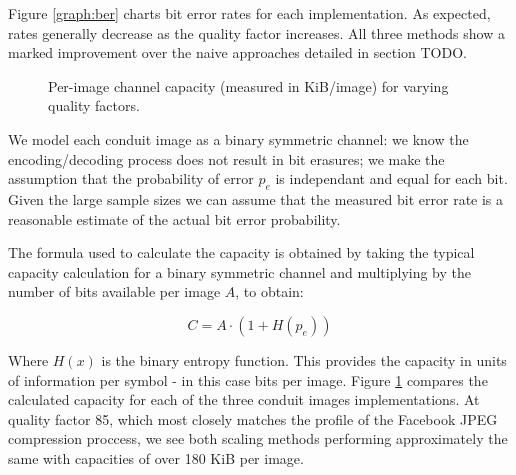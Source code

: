 Figure \ref{graph:ber} charts bit error rates for each implementation. As expected, rates generally decrease as the quality factor increases. All three methods show a marked improvement over the naive approaches detailed in section TODO.

\begin{figure}[tbph]
  \begin{center}
    \caption{Per-image channel capacity (measured in KiB/image) for varying quality factors.}
    \label{graph:capacity}
  \end{center}
\end{figure}

We model each conduit image as a binary symmetric channel: we know the encoding/decoding process does not result in bit erasures; we make the assumption that the probability of error $p_e$ is independant and equal for each bit. Given the large sample sizes we can assume that the measured bit error rate is a reasonable estimate of the actual bit error probability.

The formula used to calculate the capacity is obtained by taking the typical capacity calculation for a binary symmetric channel and multiplying by the number of bits available per image $A$, to obtain:

\begin{equation}
    C = A \cdot (1 + H(p_e))
\end{equation}

Where $H(x)$ is the binary entropy function. This provides the capacity in units of information per symbol - in this case bits per image. Figure \ref{graph:capacity} compares the calculated capacity for each of the three conduit images implementations. At quality factor 85, which most closely matches the profile of the Facebook JPEG compression proccess, we see both scaling methods performing approximately the same with capacities of over 180 KiB per image.


